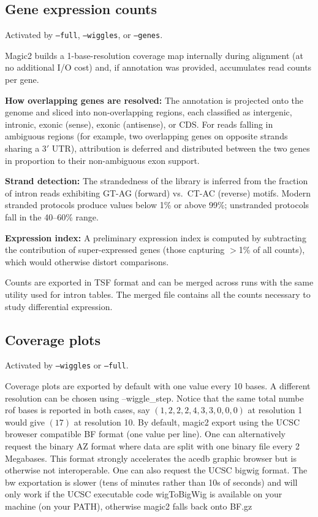 \documentclass[11pt]{article}
\newcommand{\code}[1]{\texttt{#1}}
\begin{document}
\subsection{Gene expression counts}\label{sec:genecounts}

Activated by \code{--full}, \code{--wiggles}, or \code{--genes}.

Magic2 builds a 1-base-resolution coverage map internally during
alignment (at no additional I/O cost) and, if annotation was provided,
accumulates read counts per gene.

\textbf{How overlapping genes are resolved:}
The annotation is projected onto the genome and sliced into
non-overlapping regions, each classified as intergenic, intronic,
exonic (sense), exonic (antisense), or CDS.  For reads falling in
ambiguous regions (for example, two overlapping genes on opposite
strands sharing a 3$'$ UTR), attribution is deferred and distributed
between the two genes in proportion to their non-ambiguous exon support.

\textbf{Strand detection:}
The strandedness of the library is inferred from the fraction of intron
reads exhibiting GT-AG (forward) vs.\ CT-AC (reverse) motifs.  Modern
stranded protocols produce values below 1\% or above 99\%; unstranded
protocols fall in the 40--60\% range.

\textbf{Expression index:}
A preliminary expression index is computed by subtracting the
contribution of super-expressed genes (those capturing $>$1\% of all
counts), which would otherwise distort comparisons.

Counts are exported in TSF format and can be merged across runs with
the same utility used for intron tables. The merged file contains
all the counts necessary to study differential expression.

\subsection{Coverage plots}
\label{sec:wiggles}

Activated by \code{--wiggles} or \code{--full}.

Coverage plots are exported by default with one value every 10 bases.
A different resolution can be chosen using --wiggle\_step.
Notice that the same total numbe rof bases is reported in both cases,
say $(1,2,2,2,4,3,3,0,0,0)$ at resolution 1 would give $(17)$ at resolution 10.
By default, magic2 export using the UCSC broweser compatible BF format
(one value per line). One can alternatively request the binary AZ format
where data are split with one binary file every 2 Megabases. This format
strongly accelerates the acedb graphic browser but is otherwise not
interoperable. One can also request the UCSC bigwig format. The bw exportation
is slower (tens of minutes rather than 10s of seconds) and will only work
if the UCSC executable code wigToBigWig is available on
your machine (on your PATH), otherwise magic2 falls back onto BF.gz
\end{document}
